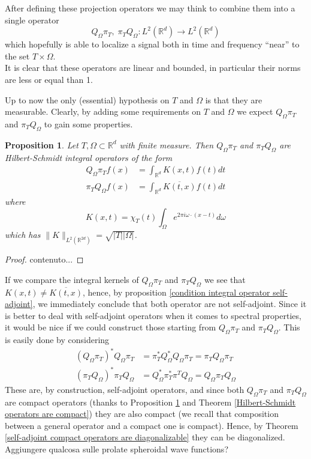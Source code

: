 \documentclass[corpo=11pt, stile=classica, tipotesi=custom,
greek, evenboxes, english]{toptesi}
\numberwithin{equation}{chapter}
\newtheorem{prop}[teo]{Proposition}
\newcommand{\R}{\mathbb{R}} %
\begin{document}
After defining these projection operators we may think to combine them into a single operator
\begin{equation*}\label{composition of projections}
	Q_{\Omega} \pi_T, \; \pi_T Q_{\Omega} : L^2(\R^d) \rightarrow L^2(\R^d)
\end{equation*}
which hopefully is able to localize a signal both in time and frequency ``near'' to the set $T \times \Omega$.\\
It is clear that these operators are linear and bounded, in particular their norms are less or equal than 1.

Up to now the only (essential) hypothesis on $T$ and $\Omega$ is that they are measurable. Clearly, by adding some requirements on $T$ and $\Omega$ we expect $Q_{\Omega} \pi_T$ and $\pi_T Q_{\Omega}$ to gain some properties.
\begin{prop}\label{projection operators are Hilbert-Schmidt}
	Let $T,\Omega \subset \R^d$ with finite measure. Then $Q_{\Omega}\pi_T$ and $\pi_T Q_{\Omega}$ are Hilbert-Schmidt integral operators of the form
	\begin{align}
		Q_{\Omega} \pi_T f(x) &= \int_{\R^d} K(x,t) f(t) dt \\
		\pi_T Q_{\Omega} f(x) &= \int_{\R^d} \overline{K(t,x)}f(t)dt
	\end{align}
	where
	\begin{equation}\label{integral kernel projection operators}
		K(x,t) = \chi_T(t) \int_{\Omega} e^{2 \pi i \omega \cdot (x-t)}d\omega
	\end{equation}
	which has $\| K \|_{L^2(\R^{2d})} = \sqrt{|T||\Omega|}$.
\end{prop}
\begin{proof}
	contenuto...
\end{proof}
If we compare the integral kernels of $Q_{\Omega}\pi_T$ and $\pi_T Q_{\Omega}$ we see that $K(x,t) \neq \overline{K(t,x)}$, hence, by proposition \ref{condition integral operator self-adjoint}, we immediately conclude that both operator are not self-adjoint. {\color{red} Since it is better to deal with self-adjoint operators when it comes to spectral properties, it would be nice if we could construct those starting from $Q_{\Omega}\pi_T$ and $\pi_T Q_{\Omega}$.} This is easily done by considering
\begin{align}
	(Q_{\Omega}\pi_T)^* Q_{\Omega}\pi_T &= \pi_T^* Q_{\Omega}^* Q_{\Omega} \pi_T= \pi_T Q_{\Omega} \pi_T\\
	(\pi_T Q_{\Omega})^* \pi_T Q_{\Omega} &= Q_{\Omega}^* \pi_T^* \pi^T Q_{\Omega} = Q_{\Omega} \pi_T Q_{\Omega}
\end{align} 
These are, by construction, self-adjoint operators, and since both $Q_{\Omega}\pi_T$ and $\pi_T Q_{\Omega}$ are compact operators (thanks to Proposition \ref{projection operators are Hilbert-Schmidt} and Theorem \ref{Hilbert-Schmidt operators are compact}) they are also compact (we recall that composition between a general operator and a compact one is compact). Hence, by Theorem \ref{self-adjoint compact operators are diagonalizable} they can be diagonalized.\\
{\color{red} Aggiungere qualcosa sulle prolate spheroidal wave functions?}
\end{document}
